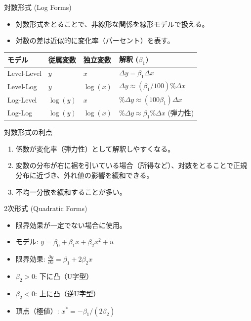 \documentclass[
  ignorenonframetext,
]{beamer}
\providecommand{\tightlist}{%
  \setlength{\itemsep}{0pt}\setlength{\parskip}{0pt}}
\begin{document}
\begin{frame}{対数形式 (Log Forms)}
\protect\hypertarget{ux5bfeux6570ux5f62ux5f0f-log-forms}{}
\begin{itemize}
\tightlist
\item
  対数形式をとることで、非線形な関係を線形モデルで扱える。
\item
  対数の差は近似的に変化率（パーセント）を表す。
\end{itemize}

\begin{longtable}[]{@{}llll@{}}
\toprule
モデル & 従属変数 & 独立変数 & 解釈 (\(\beta_1\)) \\
\midrule
\endhead
Level-Level & \(y\) & \(x\) & \(\Delta y = \beta_1 \Delta x\) \\
Level-Log & \(y\) & \(\log(x)\) &
\(\Delta y \approx (\beta_1/100) \% \Delta x\) \\
Log-Level & \(\log(y)\) & \(x\) &
\(\% \Delta y \approx (100 \beta_1) \Delta x\) \\
Log-Log & \(\log(y)\) & \(\log(x)\) &
\(\% \Delta y \approx \beta_1 \% \Delta x\) (弾力性) \\
\bottomrule
\end{longtable}
\end{frame}

\begin{frame}{対数形式の利点}
\protect\hypertarget{ux5bfeux6570ux5f62ux5f0fux306eux5229ux70b9}{}
\begin{enumerate}
\tightlist
\item
  係数が変化率（弾力性）として解釈しやすくなる。
\item
  変数の分布が右に裾を引いている場合（所得など）、対数をとることで正規分布に近づき、外れ値の影響を緩和できる。
\item
  不均一分散を緩和することが多い。
\end{enumerate}
\end{frame}

\begin{frame}{2次形式 (Quadratic Forms)}
\protect\hypertarget{ux6b21ux5f62ux5f0f-quadratic-forms}{}
\begin{itemize}
\tightlist
\item
  限界効果が一定でない場合に使用。
\item
  モデル: \(y = \beta_0 + \beta_1 x + \beta_2 x^2 + u\)
\item
  限界効果: \(\frac{\partial y}{\partial x} = \beta_1 + 2\beta_2 x\)
\item
  \(\beta_2 > 0\): 下に凸（U字型）
\item
  \(\beta_2 < 0\): 上に凸（逆U字型）
\item
  頂点（極値）: \(x^* = -\beta_1 / (2\beta_2)\)
\end{itemize}
\end{frame}
\end{document}
